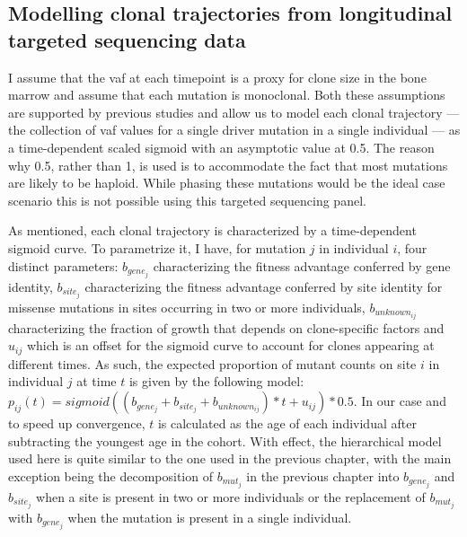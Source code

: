 \begin{figure}[!ht]
	\label{fig:study-design-ch}
\end{figure}

\subsection{Modelling clonal trajectories from longitudinal targeted sequencing data}

I assume that the \ac{vaf} at each timepoint is a proxy for clone size in the bone marrow and assume that each mutation is monoclonal. Both these assumptions are supported by previous studies \cite{Miles2020-fz,Lee2020-yp,Hwang2018-tp} and allow us to model each clonal trajectory --- the collection of \ac{vaf} values for a single driver mutation in a single individual --- as a time-dependent scaled sigmoid with an asymptotic value at 0.5. The reason why 0.5, rather than 1, is used is to accommodate the fact that most mutations are likely to be haploid. While phasing these mutations would be the ideal case scenario this is not possible using this targeted sequencing panel.

As mentioned, each clonal trajectory is characterized by a time-dependent sigmoid curve. To parametrize it, I have, for mutation $j$ in individual $i$, four distinct parameters: $b_{gene_j}$ characterizing the fitness advantage conferred by gene identity, $b_{site_j}$ characterizing the fitness advantage conferred by site identity for missense mutations in sites occurring in two or more individuals, $b_{unknown_{ij}}$ characterizing the fraction of growth that depends on clone-specific factors and $u_{ij}$ which is an offset for the sigmoid curve to account for clones appearing at different times. As such, the expected proportion of mutant counts on site $i$ in individual $j$ at time $t$ is given by the following model: $p_{ij}(t)=sigmoid((b_{gene_j}+b_{site_j}+b_{unknown_{ij}})*t + u_{ij})*0.5$. In our case and to speed up convergence, $t$ is calculated as the age of each individual after subtracting the youngest age in the cohort. With effect, the hierarchical model used here is quite similar to the one used in the previous chapter, with the main exception being the decomposition of $b_{mut_j}$ in the previous chapter into $b_{gene_j}$ and $b_{site_j}$ when a site is present in two or more individuals or the replacement of $b_{mut_j}$ with $b_{gene_j}$ when the mutation is present in a single individual.

